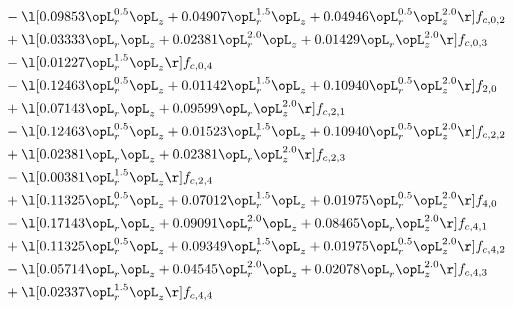 \begin{alignat}{2}
& - \l[  0.09853 \opL_r^{0.5} \opL_z +  0.04907 \opL_r^{1.5} \opL_z +  0.04946 \opL_r^{0.5} \opL_z^{2.0}  \r] f_{c,0,2} \nonumber \\ 
& + \l[  0.03333 \opL_r \opL_z +  0.02381 \opL_r^{2.0} \opL_z +  0.01429 \opL_r \opL_z^{2.0}  \r] f_{c,0,3} \nonumber \\ 
& - \l[  0.01227 \opL_r^{1.5} \opL_z  \r] f_{c,0,4} \nonumber \\ 
& - \l[  0.12463 \opL_r^{0.5} \opL_z +  0.01142 \opL_r^{1.5} \opL_z +  0.10940 \opL_r^{0.5} \opL_z^{2.0}  \r] f_{2,0} \nonumber \\ 
& + \l[  0.07143 \opL_r \opL_z +  0.09599 \opL_r \opL_z^{2.0}  \r] f_{c,2,1} \nonumber \\ 
& - \l[  0.12463 \opL_r^{0.5} \opL_z +  0.01523 \opL_r^{1.5} \opL_z +  0.10940 \opL_r^{0.5} \opL_z^{2.0}  \r] f_{c,2,2} \nonumber \\ 
& + \l[  0.02381 \opL_r \opL_z +  0.02381 \opL_r \opL_z^{2.0}  \r] f_{c,2,3} \nonumber \\ 
& - \l[  0.00381 \opL_r^{1.5} \opL_z  \r] f_{c,2,4} \nonumber \\ 
& + \l[  0.11325 \opL_r^{0.5} \opL_z +  0.07012 \opL_r^{1.5} \opL_z +  0.01975 \opL_r^{0.5} \opL_z^{2.0}  \r] f_{4,0} \nonumber \\ 
& - \l[  0.17143 \opL_r \opL_z +  0.09091 \opL_r^{2.0} \opL_z +  0.08465 \opL_r \opL_z^{2.0}  \r] f_{c,4,1} \nonumber \\ 
& + \l[  0.11325 \opL_r^{0.5} \opL_z +  0.09349 \opL_r^{1.5} \opL_z +  0.01975 \opL_r^{0.5} \opL_z^{2.0}  \r] f_{c,4,2} \nonumber \\ 
& - \l[  0.05714 \opL_r \opL_z +  0.04545 \opL_r^{2.0} \opL_z +  0.02078 \opL_r \opL_z^{2.0}  \r] f_{c,4,3} \nonumber \\ 
& + \l[  0.02337 \opL_r^{1.5} \opL_z  \r] f_{c,4,4} \nonumber \\ 
\end{alignat} 


